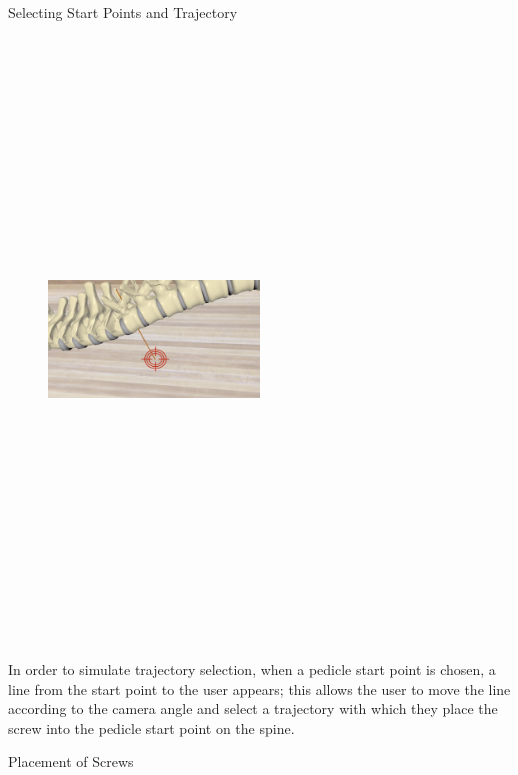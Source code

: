 \documentclass[final]{beamer}
\newlength{\onecolwid}
\begin{document}
\begin{frame}[t]
\begin{columns}[t]
\begin{column}{\onecolwid}
\begin{block}{\LARGE Selecting Start Points and Trajectory}
\begin{figure}
\centering
\includegraphics[width=0.5\textwidth, height=16cm]{trajectory.png}

\end{figure}

\large 
In order to simulate trajectory selection, when a pedicle start point is chosen, a line from the start point to the user appears; this allows the user to move the line according to the camera angle and select a trajectory with which they place the screw into the pedicle start point on the spine.

\end{block}

\begin{block}{\LARGE Placement of Screws}


\end{block}
\end{column}
\end{columns}
\end{frame}
\end{document}
